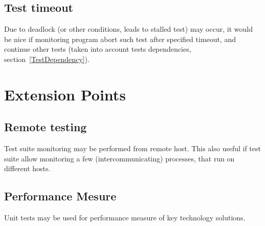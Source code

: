 \documentclass[a4paper,twoside]{article}
\begin{document}
\subsection{Test timeout}

Due to deadlock (or other conditions, leads to stalled test) may occur,
it would be nice if monitoring program abort such test after specified timeout,
and continue other tests (taken into account tests dependencies, section~\ref{TestDependency}).







\section{Extension Points}


\subsection{Remote testing}


Test suite monitoring may be performed from remote host. This also useful
if test suite allow monitoring a few (intercommunicating) processes, that
run on different hosts.

\subsection{Performance Mesure}

Unit tests may be used for performance measure of key technology solutions.
\end{document}
